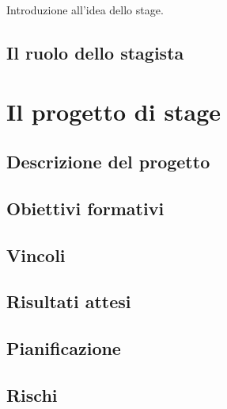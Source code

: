 Introduzione all'idea dello stage.
\subsection{Il ruolo dello stagista}
\section{Il progetto di stage}
\subsection{Descrizione del progetto}
\subsection{Obiettivi formativi}
\subsection{Vincoli}
\subsection{Risultati attesi}
\subsection{Pianificazione}
\subsection{Rischi}

